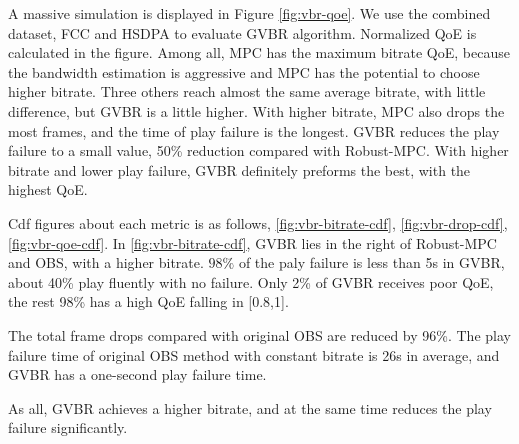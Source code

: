 A massive simulation is displayed in Figure \ref{fig:vbr-qoe}. We use the combined dataset, FCC and HSDPA to evaluate GVBR algorithm. Normalized QoE is calculated in the figure. Among all, MPC has the maximum bitrate QoE, because the bandwidth estimation is aggressive and MPC has the potential to choose higher bitrate. Three others reach almost the same average bitrate, with little difference, but GVBR is a little higher. With higher bitrate, MPC also drops the most frames, and the time of play failure is the longest. GVBR reduces the play failure to a small value, 50\% reduction compared with Robust-MPC. With higher bitrate and lower play failure, GVBR definitely preforms the best, with the highest QoE.

Cdf figures about each metric is as follows, \ref{fig:vbr-bitrate-cdf}, \ref{fig:vbr-drop-cdf}, \ref{fig:vbr-qoe-cdf}. In \ref{fig:vbr-bitrate-cdf}, GVBR lies in the right of Robust-MPC and OBS, with a higher bitrate. $98\%$ of the paly failure is less than 5s in GVBR, about 40\% play fluently with no failure. Only 2\% of GVBR receives poor QoE, the rest 98\% has a high QoE falling in [0.8,1].

The total frame drops compared with original OBS are reduced by 96\%. The play failure time of original OBS method with constant bitrate is 26s in average, and GVBR has a one-second play failure time.

As all, GVBR achieves a higher bitrate, and at the same time reduces the play failure significantly.

